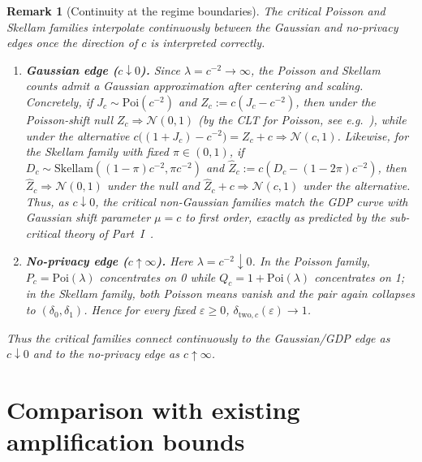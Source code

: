 \documentclass{article}
\newtheorem{remark}[theorem]{Remark}
\begin{document}
\begin{remark}[Continuity at the regime boundaries]
The critical Poisson and Skellam families interpolate continuously between the Gaussian and no-privacy edges once the direction of $c$ is interpreted correctly.
\begin{enumerate}
\item[(i)] \textbf{Gaussian edge ($c \downarrow 0$).} Since $\lambda = c^{-2} \to \infty$, the Poisson and Skellam counts admit
a Gaussian approximation after centering and scaling. Concretely, if $J_c \sim \mathrm{Poi}(c^{-2})$ and
$Z_c := c(J_c - c^{-2})$, then under the Poisson-shift null $Z_c \Rightarrow \mathcal{N}(0,1)$ (by the CLT for Poisson, see e.g.\ \cite{vdV98}), while under the alternative $c\bigl((1 + J_c) - c^{-2}\bigr) = Z_c + c \Rightarrow \mathcal{N}(c, 1)$. Likewise, for the Skellam family with fixed $\pi \in (0,1)$, if $D_c \sim \mathrm{Skellam}((1-\pi)c^{-2}, \pi c^{-2})$ and $\hat{Z}_c := c(D_c - (1-2\pi)c^{-2})$, then $\hat{Z}_c \Rightarrow \mathcal{N}(0,1)$ under the null and $\hat{Z}_c + c \Rightarrow \mathcal{N}(c,1)$ under the alternative. Thus, as $c \downarrow 0$, the critical non-Gaussian families match the GDP curve with Gaussian shift parameter $\mu = c$ to first order, exactly as predicted by the sub-critical theory of Part~I~\cite{Shv26}.
\item[(ii)] \textbf{No-privacy edge ($c \uparrow \infty$).} Here $\lambda = c^{-2} \downarrow 0$. In the Poisson family, $P_c = \mathrm{Poi}(\lambda)$ concentrates on 0 while $Q_c = 1 + \mathrm{Poi}(\lambda)$ concentrates on 1; in the Skellam family, both Poisson means vanish and the pair again collapses to $(\delta_0, \delta_1)$. Hence for every fixed $\varepsilon \geq 0$, $\delta_{\mathrm{two},c}(\varepsilon) \to 1$.
\end{enumerate}
Thus the critical families connect continuously to the Gaussian/GDP edge as $c \downarrow 0$ and to the no-privacy edge as $c \uparrow \infty$.
\end{remark}

\section{Comparison with existing amplification bounds}
\label{sec:comparison-existing-bounds}
\end{document}
